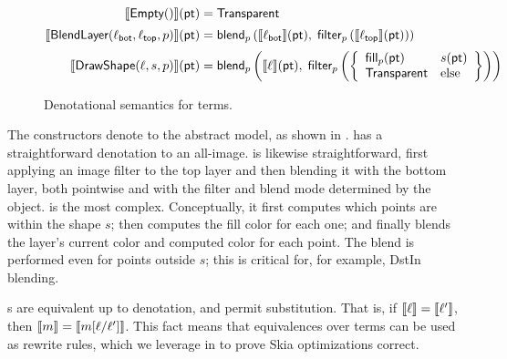 \documentclass[main.tex]{subfiles}
\begin{document}
\begin{figure}
  \begin{align*}
    \llbracket\textsf{Empty}()\rrbracket(\textsf{pt})
    &= \textsf{Transparent}\\[2pt]
    \llbracket\textsf{BlendLayer}(\ell_\textsf{bot}, \ell_\textsf{top}, p)\rrbracket(\mathsf{pt})
    &= \mathsf{blend}_p\left(\llbracket\mathsf{\ell_{bot}}\rrbracket(\mathsf{pt}),\;
        \textsf{filter}_p\left(\llbracket\mathsf{\ell_{top}}\rrbracket(\mathsf{pt})\right)
      \right) \\[2pt]
    \llbracket\textsf{DrawShape}(\ell, s, p)\rrbracket(\mathsf{pt})
    &= \mathsf{blend}_p\left(\llbracket\ell\rrbracket(\mathsf{pt}),\;
      \textsf{filter}_p\left(
       \left\{
       \begin{array}{ll}
         \mathsf{fill}_p(\mathsf{pt}) & s(\mathsf{pt}) \\
         \textsf{Transparent} & \textrm{else}
       \end{array}
       \right\}
       \right)\right)\\
  \end{align*}
  \caption{Denotational semantics for \Layer terms.}
  \label{fig:denote}
\end{figure}

The \layer constructors denote to the abstract model,
  as shown in .
\Empty has a straightforward denotation
  to an all-\Transparent image.
\BlendLayer is likewise straightforward,
  first applying an image filter to the top layer
  and then blending it with the bottom layer,
  both pointwise and with
  the filter and blend mode determined by the \Paint object.
\DrawShape is the most complex.
Conceptually, it first computes which points
  are within the shape $s$;
  then computes the fill color for each one;
  and finally blends the layer's current color
  and computed color for each point.
The blend is performed even for points outside $s$;
  this is critical for, for example, \textsf{DstIn} blending.

\Layer{}s are equivalent up to denotation,
  and permit substitution.
That is, if $\llbracket\ell\rrbracket = \llbracket\ell'\rrbracket$,
  then $\llbracket m\rrbracket = \llbracket m[\ell/\ell']\rrbracket$.
This fact means that equivalences over \Layer terms
  can be used as rewrite rules,
  which we leverage in 
  to prove Skia optimizations correct.

\subsection{\texorpdfstring{\muskia}{muSkia}}
\label{subsec:muskia}
\end{document}

